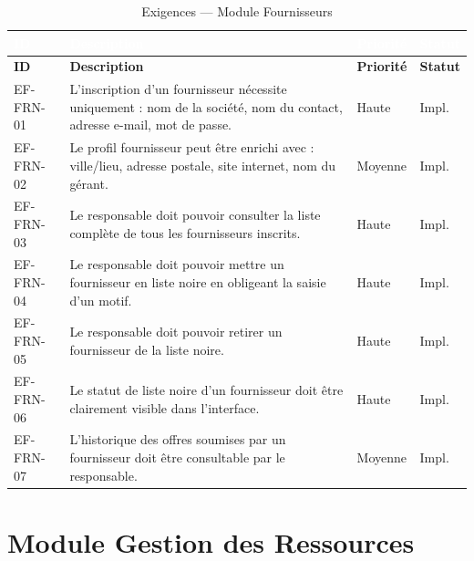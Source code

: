 \documentclass[12pt,a4paper]{report}
\begin{document}
\begin{longtable}{|C{1.8cm}|L{8.5cm}|C{2cm}|C{2cm}|}
\caption{Exigences — Module Fournisseurs} \\
\hline
{}\textcolor{white}{\textbf{ID}} & \textcolor{white}{\textbf{Description}} & \textcolor{white}{\textbf{Priorité}} & \textcolor{white}{\textbf{Statut}} \\
\hline
\endfirsthead
\hline
\textbf{ID} & \textbf{Description} & \textbf{Priorité} & \textbf{Statut} \\
\hline
\endhead
EF-FRN-01 & L'inscription d'un fournisseur nécessite uniquement : nom de la société, nom du contact, adresse e-mail, mot de passe. & Haute & Impl. \\
\hline
EF-FRN-02 & Le profil fournisseur peut être enrichi avec : ville/lieu, adresse postale, site internet, nom du gérant. & Moyenne & Impl. \\
\hline
EF-FRN-03 & Le responsable doit pouvoir consulter la liste complète de tous les fournisseurs inscrits. & Haute & Impl. \\
\hline
EF-FRN-04 & Le responsable doit pouvoir mettre un fournisseur en liste noire en obligeant la saisie d'un motif. & Haute & Impl. \\
\hline
EF-FRN-05 & Le responsable doit pouvoir retirer un fournisseur de la liste noire. & Haute & Impl. \\
\hline
EF-FRN-06 & Le statut de liste noire d'un fournisseur doit être clairement visible dans l'interface. & Haute & Impl. \\
\hline
EF-FRN-07 & L'historique des offres soumises par un fournisseur doit être consultable par le responsable. & Moyenne & Impl. \\
\hline
\end{longtable}

\section{Module Gestion des Ressources}
\end{document}
